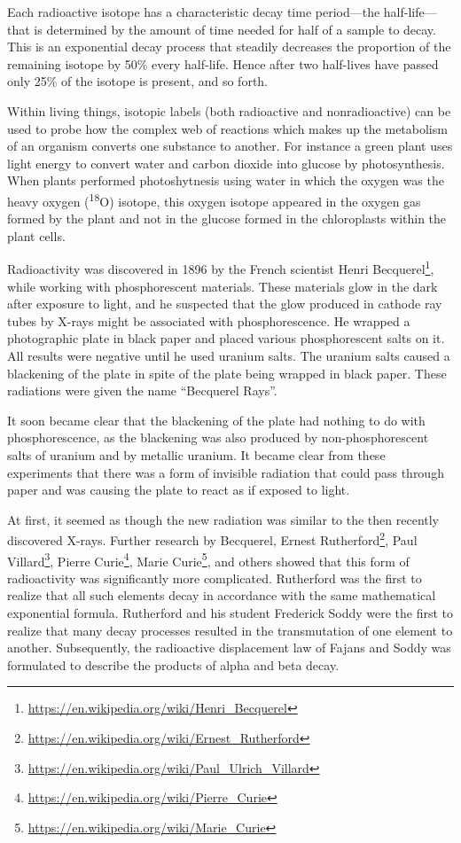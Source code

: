 \documentclass[
]{article}
\let\rmarkdownfootnote\footnote%
\def\footnote{\protect\rmarkdownfootnote}
\renewcommand{\href}[2]{#2\footnote{\url{#1}}}
\theoremstyle{definition}
\theoremstyle{definition}
\theoremstyle{definition}
\theoremstyle{remark}
\begin{document}
Each radioactive isotope has a characteristic decay time period---the
half-life---that is determined by the amount of time needed for half of
a sample to decay. This is an exponential decay process that steadily
decreases the proportion of the remaining isotope by 50\% every
half-life. Hence after two half-lives have passed only 25\% of the
isotope is present, and so forth.

Within living things, isotopic labels (both radioactive and
nonradioactive) can be used to probe how the complex web of reactions
which makes up the metabolism of an organism converts one substance to
another. For instance a green plant uses light energy to convert water
and carbon dioxide into glucose by photosynthesis. When plants performed
photoshytnesis using water in which the oxygen was the heavy oxygen
(\textsuperscript{18}O) isotope, this oxygen isotope appeared in the
oxygen gas formed by the plant and not in the glucose formed in the
chloroplasts within the plant cells.

Radioactivity was discovered in 1896 by the French scientist
\href{https://en.wikipedia.org/wiki/Henri_Becquerel}{Henri Becquerel},
while working with phosphorescent materials. These materials glow in the
dark after exposure to light, and he suspected that the glow produced in
cathode ray tubes by X-rays might be associated with phosphorescence. He
wrapped a photographic plate in black paper and placed various
phosphorescent salts on it. All results were negative until he used
uranium salts. The uranium salts caused a blackening of the plate in
spite of the plate being wrapped in black paper. These radiations were
given the name ``Becquerel Rays''.

It soon became clear that the blackening of the plate had nothing to do
with phosphorescence, as the blackening was also produced by
non-phosphorescent salts of uranium and by metallic uranium. It became
clear from these experiments that there was a form of invisible
radiation that could pass through paper and was causing the plate to
react as if exposed to light.

At first, it seemed as though the new radiation was similar to the then
recently discovered X-rays. Further research by Becquerel,
\href{https://en.wikipedia.org/wiki/Ernest_Rutherford}{Ernest
Rutherford},
\href{https://en.wikipedia.org/wiki/Paul_Ulrich_Villard}{Paul Villard},
\href{https://en.wikipedia.org/wiki/Pierre_Curie}{Pierre Curie},
\href{https://en.wikipedia.org/wiki/Marie_Curie}{Marie Curie}, and
others showed that this form of radioactivity was significantly more
complicated. Rutherford was the first to realize that all such elements
decay in accordance with the same mathematical exponential formula.
Rutherford and his student Frederick Soddy were the first to realize
that many decay processes resulted in the transmutation of one element
to another. Subsequently, the radioactive displacement law of Fajans and
Soddy was formulated to describe the products of alpha and beta decay.
\end{document}
